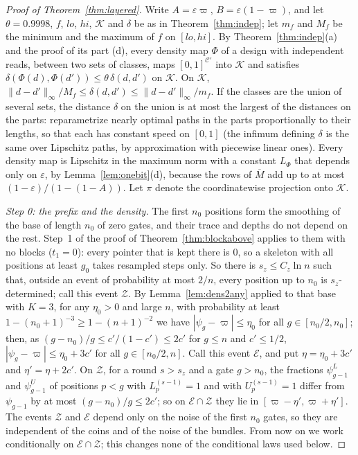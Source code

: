 \documentclass[11pt]{amsart}
\theoremstyle{definition}
\theoremstyle{remark}
\newcommand{\eps}{\varepsilon}
\begin{document}
\begin{proof}[Proof of Theorem~\ref{thm:layered}]
Write $A=\eps\varpi$, $B=\eps(1-\varpi)$, and let $\theta=0.9998$, $f$, $lo$, $hi$, $\mathcal K$ and
$\delta$ be as in Theorem~\ref{thm:indep}; let $m_f$ and $M_f$ be the minimum and the maximum of
$f$ on $[lo,hi]$. By Theorem~\ref{thm:indep}(a) and the proof of its part (d), every density map
$\Phi$ of a design with independent reads, between two sets of classes, maps $[0,1]^{\mathcal C'}$
into $\mathcal K$ and satisfies $\delta(\Phi(d),\Phi(d'))\le\theta\,\delta(d,d')$ on $\mathcal K$. On
$\mathcal K$, $\|d-d'\|_\infty/M_f\le\delta(d,d')\le\|d-d'\|_\infty/m_f$. If the classes are the
union of several sets, the distance $\delta$ on the union is at most the largest of the distances
on the parts: reparametrize nearly optimal paths in the parts proportionally to their lengths, so
that each has constant speed on $[0,1]$ (the infimum defining $\delta$ is the same over Lipschitz
paths, by approximation with piecewise linear ones). Every density map is Lipschitz in the maximum norm with a
constant $L_\Phi$ that depends only on $\eps$, by Lemma~\ref{lem:onebit}(d), because the rows of
$\overline M$ add up to at most $(1-\eps)/(1-(1-A))$. Let $\pi$ denote the coordinatewise
projection onto $\mathcal K$.

\emph{Step 0: the prefix and the density.} The first $n_0$ positions form the smoothing of the base
of length $n_0$ of zero gates, and their trace and depths do not depend on the rest. Step~1 of the
proof of Theorem~\ref{thm:blockabove} applies to them with no blocks ($t_1=0$): every pointer that
is kept there is $0$, so a skeleton with all positions at least $g_0$ takes resampled steps only.
So there is $s_z\le C_z\ln n$ such that, outside an event of probability at most $2/n$, every
position up to $n_0$ is $s_z$-determined; call this event $\mathcal Z$. By
Lemma~\ref{lem:dens2any} applied to that base with $K=3$, for any $\eta_0>0$ and large $n$, with
probability at least $1-(n_0+1)^{-3}\ge1-(n+1)^{-2}$ we have $|\psi_g-\varpi|\le\eta_0$ for all $g\in[n_0/2,n_0]$; then, as
$(g-n_0)/g\le c'/(1-c')\le2c'$ for $g\le n$ and $c'\le1/2$, $|\psi_g-\varpi|\le\eta_0+3c'$ for all
$g\in[n_0/2,n]$. Call this event $\mathcal E$, and put $\eta=\eta_0+3c'$ and $\eta'=\eta+2c'$. On
$\mathcal Z$, for a round $s>s_z$ and a gate $g>n_0$, the fractions $\psi^L_{g-1}$ and
$\psi^U_{g-1}$ of positions $p<g$ with $L^{(s-1)}_p=1$ and with $U^{(s-1)}_p=1$ differ from
$\psi_{g-1}$ by at most $(g-n_0)/g\le2c'$; so on $\mathcal E\cap\mathcal Z$ they lie in
$[\varpi-\eta',\varpi+\eta']$. The events $\mathcal Z$ and $\mathcal E$ depend only on the noise of
the first $n_0$ gates, so they are independent of the coins and of the noise of the bundles. From
now on we work conditionally on $\mathcal E\cap\mathcal Z$; this changes none of the conditional
laws used below.


\end{proof}
\end{document}
